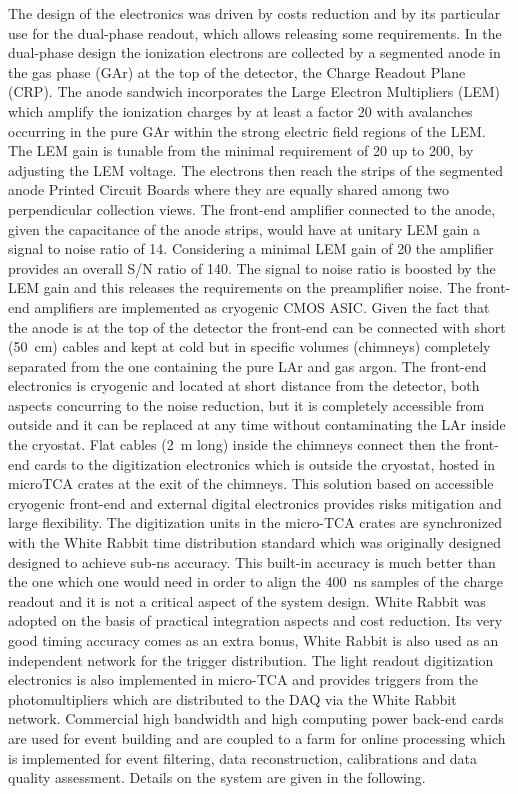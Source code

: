 The design of the electronics was driven by costs reduction and by its
particular use for the dual-phase readout, which allows releasing
some requirements. In the dual-phase design the ionization electrons
are collected by a segmented anode in the gas phase (GAr) at the top
of the detector, the Charge Readout Plane (CRP). The anode sandwich
incorporates the Large Electron Multipliers (LEM) which amplify the
ionization charges by at least a factor 20 with avalanches occurring
in the pure GAr within the strong electric field regions of the
LEM. The LEM gain is tunable from the minimal requirement of 20 up to
200, by adjusting the LEM voltage. The electrons then reach the strips
of the segmented anode Printed Circuit Boards where they are equally
shared among two perpendicular collection views. The front-end
amplifier connected to the anode, given the capacitance of the anode
strips, would have at unitary LEM gain a signal to noise ratio of
14. Considering a minimal LEM gain of 20 the amplifier provides an
overall S/N ratio of 140. The signal to noise ratio is boosted by the
LEM gain and this releases the requirements on the preamplifier
noise. The front-end amplifiers are implemented as cryogenic CMOS
ASIC. Given the fact that the anode is at the top of the detector the
front-end can be connected with short (50~cm) cables and kept at cold
but in specific volumes (chimneys) completely separated from the one
containing the pure LAr and gas argon. The front-end electronics is
cryogenic and located at short distance from the detector, both
aspects concurring to the noise reduction, but it is completely
accessible from outside and it can be replaced at any time without
contaminating the LAr inside the cryostat. Flat cables (2~m long)
inside the chimneys connect then the front-end cards to the
digitization electronics which is outside the cryostat, hosted in
microTCA crates at the exit of the chimneys. This solution based on
accessible cryogenic front-end and external digital electronics
provides risks mitigation and large flexibility. The digitization
units in the micro-TCA crates are synchronized with the White Rabbit
time distribution standard which was originally designed designed to
achieve sub-ns accuracy. This built-in accuracy is much better than
the one which one would need in order to align the 400~ns samples of
the charge readout and it is not a critical aspect of the system
design. White Rabbit was adopted on the basis of practical integration
aspects and cost reduction. Its very good timing accuracy comes as an
extra bonus, White Rabbit is also used as an independent network for
the trigger distribution. The light readout digitization electronics
is also implemented in micro-TCA and provides triggers from the
photomultipliers which are distributed to the DAQ via the White Rabbit
network. Commercial high bandwidth and high computing power back-end
cards are used for event building and are coupled to a farm for online
processing which is implemented for event filtering, data
reconstruction, calibrations and data quality assessment. Details on
the system are given in the following.


